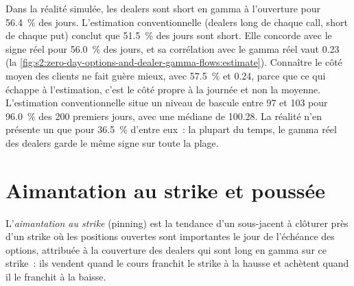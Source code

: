 Dans la réalité simulée, les dealers sont short en gamma à l'ouverture pour 56.4~\% des jours. L'estimation conventionnelle (dealers long de chaque call, short de chaque put) conclut que 51.5~\% des
jours sont short. Elle concorde avec le signe réel pour 56.0~\% des jours, et sa corrélation avec le gamma réel vaut 0.23
(la \cref{fig:s2:zero-day-options-and-dealer-gamma-flows:estimate}). Connaître le côté moyen des clients ne fait guère mieux, avec 57.5~\% et 0.24, parce que
ce qui échappe à l'estimation, c'est le côté propre à la journée et non la moyenne. L'estimation conventionnelle situe un niveau de bascule entre 97 et 103 pour 96.0~\% des
200 premiers jours, avec une médiane de 100.28. La réalité n'en présente un que pour 36.5~\% d'entre eux~: la plupart du temps, le gamma réel des dealers garde le même signe sur
toute la plage.

\begin{omfigure}

\label{fig:s2:zero-day-options-and-dealer-gamma-flows:estimate}
\end{omfigure}

\section{Aimantation au strike et poussée}

\begin{definition}\label{def:s2:zero-day-options-and-dealer-gamma-flows:pinning}
L'\emph{aimantation au strike} (pinning) est la tendance d'un sous-jacent à clôturer près d'un strike où les positions ouvertes sont importantes le jour de l'échéance des options, attribuée
à la couverture des dealers qui sont long en gamma sur ce strike~: ils vendent quand le cours franchit le strike à la hausse et achètent quand il le franchit à la baisse.
\end{definition}

